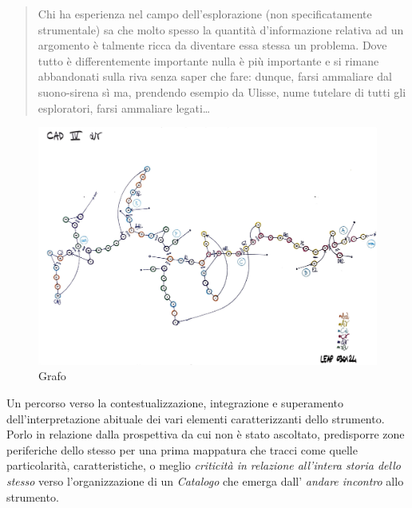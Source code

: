 \documentclass{gs-adonis}
\begin{document}
\begin{quote}
  Chi  ha  esperienza  nel  campo  dell’esplorazione  (non  specificatamente
  strumentale) sa che molto spesso la quantità d’informazione relativa ad un
  argomento  è  talmente  ricca  da  diventare  essa  stessa  un  problema.
  Dove tutto  è differentemente  importante  nulla  è  più  importante  e  si
  rimane abbandonati sulla riva senza saper che fare: dunque, farsi ammaliare dal
  suono-sirena sì ma, prendendo esempio da Ulisse, nume tutelare di tutti gli
  esploratori, farsi ammaliare legati\ldots
\end{quote}

\begin{figure}[t]
  \centering
  \includegraphics[width=\linewidth]{images/CAD-IV-GRAFO-ANNOTATO.pdf}
  \captionsetup{width=.81\linewidth}
  \caption{Grafo}
  \label{grafo}
\end{figure}

Un percorso verso la contestualizzazione, integrazione e superamento
dell’interpretazione abituale dei vari elementi caratterizzanti dello strumento.
Porlo in relazione dalla prospettiva da cui non è stato ascoltato, predisporre
zone periferiche dello stesso per una prima mappatura che tracci come
quelle particolarità, caratteristiche, o meglio \emph{criticità in relazione
all'intera storia dello stesso} verso l'organizzazione di un \emph{Catalogo} che
emerga dall' \emph{andare incontro} allo strumento.
\end{document}
